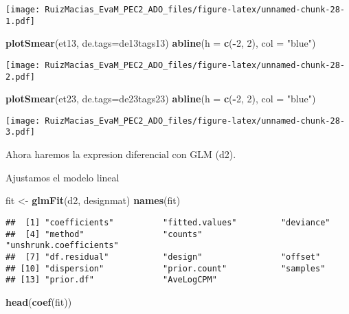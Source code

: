 \documentclass[
]{article}
\newenvironment{Shaded}{\begin{snugshade}}{\end{snugshade}}
\newcommand{\DataTypeTok}[1]{\textcolor[rgb]{0.13,0.29,0.53}{#1}}
\newcommand{\DecValTok}[1]{\textcolor[rgb]{0.00,0.00,0.81}{#1}}
\newcommand{\KeywordTok}[1]{\textcolor[rgb]{0.13,0.29,0.53}{\textbf{#1}}}
\newcommand{\NormalTok}[1]{#1}
\newcommand{\OperatorTok}[1]{\textcolor[rgb]{0.81,0.36,0.00}{\textbf{#1}}}
\newcommand{\StringTok}[1]{\textcolor[rgb]{0.31,0.60,0.02}{#1}}
\begin{document}
\texttt{[image: RuizMacias\_EvaM\_PEC2\_ADO\_files/figure-latex/unnamed-chunk-28-1.pdf]}

\begin{Shaded}
\begin{Highlighting}[]
\KeywordTok{plotSmear}\NormalTok{(et13, }\DataTypeTok{de.tags=}\NormalTok{de13tags13)}
\KeywordTok{abline}\NormalTok{(}\DataTypeTok{h =} \KeywordTok{c}\NormalTok{(}\OperatorTok{-}\DecValTok{2}\NormalTok{, }\DecValTok{2}\NormalTok{), }\DataTypeTok{col =} \StringTok{"blue"}\NormalTok{)}
\end{Highlighting}
\end{Shaded}

\texttt{[image: RuizMacias\_EvaM\_PEC2\_ADO\_files/figure-latex/unnamed-chunk-28-2.pdf]}

\begin{Shaded}
\begin{Highlighting}[]
\KeywordTok{plotSmear}\NormalTok{(et23, }\DataTypeTok{de.tags=}\NormalTok{de23tags23)}
\KeywordTok{abline}\NormalTok{(}\DataTypeTok{h =} \KeywordTok{c}\NormalTok{(}\OperatorTok{-}\DecValTok{2}\NormalTok{, }\DecValTok{2}\NormalTok{), }\DataTypeTok{col =} \StringTok{"blue"}\NormalTok{)}
\end{Highlighting}
\end{Shaded}

\texttt{[image: RuizMacias\_EvaM\_PEC2\_ADO\_files/figure-latex/unnamed-chunk-28-3.pdf]}

Ahora haremos la expresion diferencial con GLM (d2).

Ajustamos el modelo lineal

\begin{Shaded}
\begin{Highlighting}[]
\NormalTok{fit <-}\StringTok{ }\KeywordTok{glmFit}\NormalTok{(d2, designmat)}
\KeywordTok{names}\NormalTok{(fit)}
\end{Highlighting}
\end{Shaded}

\begin{verbatim}
##  [1] "coefficients"          "fitted.values"         "deviance"             
##  [4] "method"                "counts"                "unshrunk.coefficients"
##  [7] "df.residual"           "design"                "offset"               
## [10] "dispersion"            "prior.count"           "samples"              
## [13] "prior.df"              "AveLogCPM"
\end{verbatim}

\begin{Shaded}
\begin{Highlighting}[]
\KeywordTok{head}\NormalTok{(}\KeywordTok{coef}\NormalTok{(fit))}
\end{Highlighting}
\end{Shaded}
\end{document}
